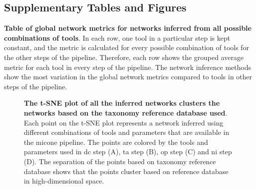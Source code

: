   \FloatBarrier
  \newpage
  \subsection*{Supplementary Tables and Figures}

  \renewcommand{\thefigure}{S\arabic{figure}}
  \setcounter{figure}{0}

  \renewcommand{\thetable}{S\arabic{table}}
  \setcounter{table}{0}

  \begin{table}[H]
    \centering
    \caption{
      \textbf{Table of global network metrics for networks inferred from all possible combinations of tools}.
      In each row, one tool in a particular step is kept constant, and the metric is calculated for every possible combination of tools for the other steps of the pipeline.
      Therefore, each row shows the grouped average metric for each tool in every step of the pipeline.
      The network inference methods show the most variation in the global network metrics compared to tools in other steps of the pipeline.
    }
    \label{tab:network_metrics}
  \end{table}


    \begin{figure}[H]
      \centering
        \caption{
          \textbf{The t-SNE plot of all the inferred networks clusters the networks based on the taxonomy reference database used}.
          Each point on the t-SNE plot represents a network inferred using different combinations of tools and parameters that are available in the \ac{micone} pipeline.
          The points are colored by the tools and parameters used in \ac{dc} step (A), \ac{ta} step (B), \ac{op} step (C) and \ac{ni} step (D).
          The separation of the points based on taxonomy reference database shows that the points cluster based on reference database in high-dimensional space.
        }
      \label{fig:figure_s1}
    \end{figure}

